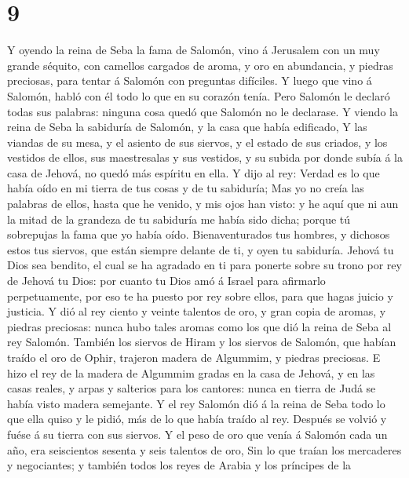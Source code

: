 \hypertarget{section-8}{%
\section{9}\label{section-8}}

 Y oyendo la reina de Seba la fama de Salomón, vino á
Jerusalem con un muy grande séquito, con camellos cargados de aroma, y
oro en abundancia, y piedras preciosas, para tentar á Salomón con
preguntas difíciles. Y luego que vino á Salomón, habló con él todo lo
que en su corazón tenía.  Pero Salomón le declaró todas sus
palabras: ninguna cosa quedó que Salomón no le declarase.  Y
viendo la reina de Seba la sabiduría de Salomón, y la casa que había
edificado,  Y las viandas de su mesa, y el asiento de sus
siervos, y el estado de sus criados, y los vestidos de ellos, sus
maestresalas y sus vestidos, y su subida por donde subía á la casa de
Jehová, no quedó más espíritu en ella.  Y dijo al rey:
Verdad es lo que había oído en mi tierra de tus cosas y de tu sabiduría;
 Mas yo no creía las palabras de ellos, hasta que he venido,
y mis ojos han visto: y he aquí que ni aun la mitad de la grandeza de tu
sabiduría me había sido dicha; porque tú sobrepujas la fama que yo había
oído.  Bienaventurados tus hombres, y dichosos estos tus
siervos, que están siempre delante de ti, y oyen tu sabiduría.
 Jehová tu Dios sea bendito, el cual se ha agradado en ti
para ponerte sobre su trono por rey de Jehová tu Dios: por cuanto tu
Dios amó á Israel para afirmarlo perpetuamente, por eso te ha puesto por
rey sobre ellos, para que hagas juicio y justicia.  Y dió al
rey ciento y veinte talentos de oro, y gran copia de aromas, y piedras
preciosas: nunca hubo tales aromas como los que dió la reina de Seba al
rey Salomón.  También los siervos de Hiram y los siervos de
Salomón, que habían traído el oro de Ophir, trajeron madera de Algummim,
y piedras preciosas.  E hizo el rey de la madera de
Algummim gradas en la casa de Jehová, y en las casas reales, y arpas y
salterios para los cantores: nunca en tierra de Judá se había visto
madera semejante.  Y el rey Salomón dió á la reina de Seba
todo lo que ella quiso y le pidió, más de lo que había traído al rey.
Después se volvió y fuése á su tierra con sus siervos.  Y
el peso de oro que venía á Salomón cada un año, era seiscientos sesenta
y seis talentos de oro,  Sin lo que traían los mercaderes y
negociantes; y también todos los reyes de Arabia y los príncipes de la
